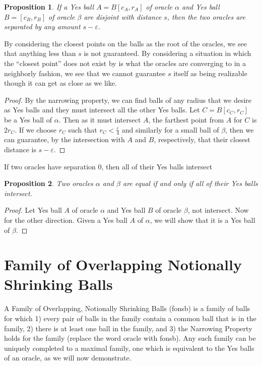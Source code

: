 \documentclass[12pt]{article}
\newtheorem{proposition}{Proposition}[section]
\begin{document}
\begin{proposition}
If a Yes ball $A = B[c_A, r_A]$ of oracle $\alpha$ and Yes ball $B=[c_B, r_B]$ of oracle $\beta$ are disjoint with distance $s$, then the two oracles are separated by any amount $s-\varepsilon$.
\end{proposition}

By considering the closest points on the balls as the root of the oracles, we see that anything less than $s$ is not guaranteed. By considering a situation in which the ``closest point'' does not exist by is what the oracles are converging to in a neighborly fashion, we see that we cannot guarantee $s$ itself as being realizable though it can get as close as we like. 

\begin{proof}
    By the narrowing property, we can find balls of any radius that we desire as Yes balls and they must intersect all the other Yes balls. Let $C = B[c_C, r_C]$ be a Yes ball of $\alpha$. Then as it must intersect $A$, the farthest point from $A$ for $C$ is $2r_C$. If we choose $r_C$ such that $r_C < \frac{\varepsilon}{4}$ and similarly for a small ball of $\beta$, then we can guarantee, by the intersection with $A$ and $B$, respectively, that their closest distance is $s - \varepsilon$. 
\end{proof}

If two oracles have separation 0, then all of their Yes balls intersect

\begin{proposition}
    Two oracles $\alpha$ and $\beta$ are equal if and only if all of their Yes balls intersect. 
\end{proposition}

\begin{proof}
    Let Yes ball $A$ of oracle $\alpha$ and Yes ball $B$ of oracle $\beta$, not intersect. 
    Now for the other direction. 
    Given a Yes ball $A$ of $\alpha$, we will show that it is a Yes ball of $\beta$. 
\end{proof}




\section{Family of Overlapping Notionally Shrinking Balls}

A Family of Overlapping, Notionally Shrinking Balls (fonsb) is a family of balls for which 1) every pair of balls in the family contain a common ball that is in the family, 2) there is at least one ball in the family, and 3) the Narrowing Property holds for the family (replace the word oracle with fonsb). Any such family can be uniquely completed to a maximal family, one which is equivalent to the Yes balls of an oracle, as we will now demonstrate. 
\end{document}
